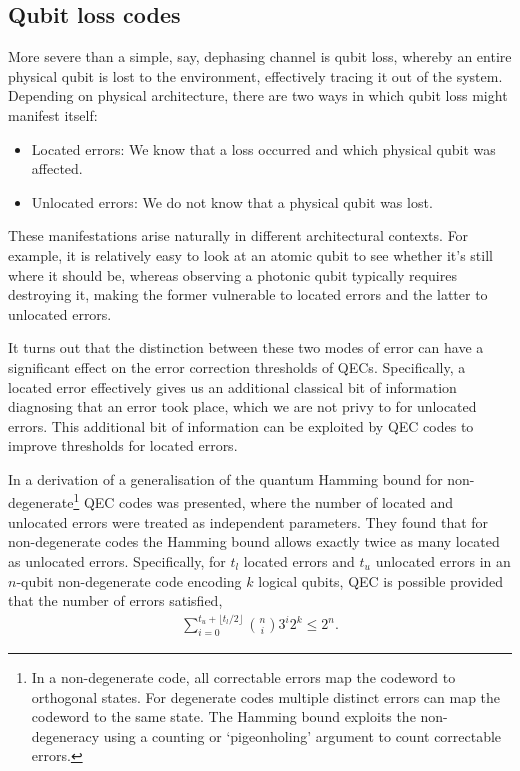 %
%

\subsection{Qubit loss codes}

More severe than a simple, say, dephasing channel is qubit loss, whereby an entire physical qubit is lost to the environment, effectively tracing it out of the system. Depending on physical architecture, there are two ways in which qubit loss might manifest itself:
\begin{itemize}
\item Located errors: We know that a loss occurred and which physical qubit was affected.
\item Unlocated errors: We do not know that a physical qubit was lost.
\end{itemize}

These manifestations arise naturally in different architectural contexts. For example, it is relatively easy to look at an atomic qubit to see whether it's still where it should be, whereas observing a photonic qubit typically requires destroying it, making the former vulnerable to located errors and the latter to unlocated errors.

It turns out that the distinction between these two modes of error can have a significant effect on the error correction thresholds of QECs. Specifically, a located error effectively gives us an additional classical bit of information diagnosing that an error took place, which we are not privy to for unlocated errors. This additional bit of information can be exploited by QEC codes to improve thresholds for located errors.

In \cite{RohdeHaselgrove} a derivation of a generalisation of the quantum Hamming bound for non-degenerate\footnote{In a non-degenerate code, all correctable errors map the codeword to orthogonal states. For degenerate codes multiple distinct errors can map the codeword to the same state. The Hamming bound exploits the non-degeneracy using a counting or `pigeonholing' argument to count correctable errors.} QEC codes was presented, where the number of located and unlocated errors were treated as independent parameters. They found that for non-degenerate codes the Hamming bound allows exactly twice as many located as unlocated errors. Specifically, for $t_l$ located errors and $t_u$ unlocated errors in an $n$-qubit non-degenerate code encoding $k$ logical qubits, QEC is possible provided that the number of errors satisfied,
\begin{align}
\sum_{i=0}^{t_u + \lfloor t_l/2 \rfloor} \binom{n}{i}3^i 2^k \leq 2^n.
\end{align}

